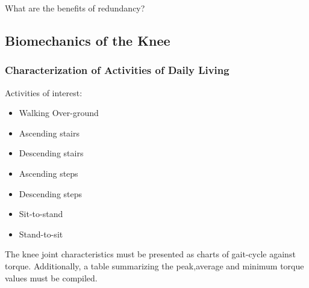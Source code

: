 What are the benefits of redundancy?

\subsection{Biomechanics of the Knee}
\subsubsection{Characterization of Activities of Daily Living}

Activities of interest:
\begin{itemize}
    \item Walking Over-ground
    \item Ascending stairs
    \item Descending stairs
    \item Ascending steps
    \item Descending steps
    \item Sit-to-stand
    \item Stand-to-sit
\end{itemize}

The knee joint characteristics must be presented as charts of gait-cycle against torque. Additionally, a table summarizing the peak,average and minimum torque values must be compiled.